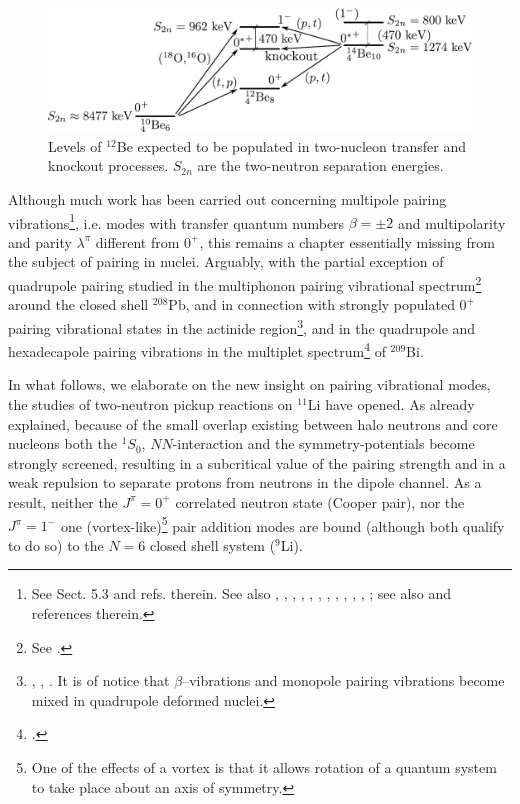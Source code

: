 \begin{subappendices}
\begin{figure}
\includegraphics[width=\textwidth]{C8/figsC8/figa4_newnew.pdf}
\caption{Levels of $^{12}$Be expected to be populated in two-nucleon transfer and knockout processes. $S_{2n}$ are the two-neutron separation energies.}\label{fig6.I.4}
\end{figure}




Although much work has been carried out concerning multipole pairing vibrations\footnote{\label{f38C7} See \cite{Brink:05} Sect. 5.3 and refs. therein. See also  \cite{Broglia:74}, \cite{Ragnarsson:76}, \cite{Broglia:71b}, \cite{Broglia:71c}, \cite{Bes:71d}, \cite{Bes:71}, \cite{Flynn:71}, \cite{Bes:72}, \cite{Broglia:81c}, \cite{Bohr:74b}, \cite{Flynn:72},  \cite{Bortignon:76}; see also \cite{Kubo:70} and references therein.}, i.e. modes with transfer quantum numbers $\beta=\pm2$ and multipolarity and parity $\lambda^\pi$ different from $0^+$, this remains a chapter essentially missing from the subject of pairing in nuclei. Arguably, with the partial exception of quadrupole pairing studied in the multiphonon pairing vibrational spectrum\footnote{\label{f39C7} See \cite{Flynn:72}.} around the closed shell $^{208}$Pb, and in connection with strongly populated $0^+$ pairing vibrational states in the actinide region\footnote{\label{f40C7} \cite{Casten:72}, \cite{Bes:72}, \cite{Ragnarsson:76}. It is of notice that $\beta$--vibrations and monopole pairing vibrations become mixed in quadrupole deformed nuclei.}, and in  the quadrupole and hexadecapole pairing vibrations in the multiplet spectrum\footnote{\cite{Bortignon:76}.} of $^{209}$Bi.

In what follows, we  elaborate on the new insight on pairing vibrational modes, the studies of two-neutron pickup reactions on $^{11}$Li have opened. As already explained, because of the small overlap existing between halo neutrons and core nucleons both the $^1S_0$, $NN$-interaction and the symmetry-potentials become strongly screened, resulting in a subcritical value of the pairing strength and in a weak repulsion to separate protons from neutrons in the dipole channel.
As a result, neither the $J^{\pi}=0^+$ correlated neutron state  (Cooper pair), nor the $J^\pi=1^-$ one (vortex-like)\footnote{One of the effects of a vortex is that it allows rotation of a quantum system to take place about an axis of symmetry.} pair addition modes are bound 
(although both qualify to do so) to the $N=6$ closed shell system ($^{9}$Li). 





\end{subappendices}
